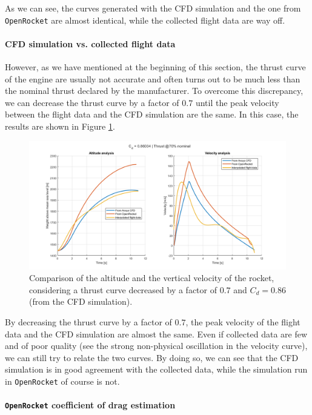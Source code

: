 As we can see, the curves generated with the CFD simulation and the one from \texttt{OpenRocket} are almost identical, while the collected flight data are way off.

\paragraph{CFD simulation vs. collected flight data}

However, as we have mentioned at the beginning of this section, the thrust curve of the engine are usually not accurate and often turns out to be much less than the nominal thrust declared by the manufacturer.
To overcome this discrepancy, we can decrease the thrust curve by a factor of $0.7$ until the peak velocity between the flight data and the CFD simulation are the same.
In this case, the results are shown in Figure \ref{fig:comparison_flight_data_70}.

\begin{figure}[H]
    \centering
    \includegraphics[width=\textwidth]{img/Validation/All_70.png}
    \caption{Comparison of the altitude and the vertical velocity of the rocket, considering a thrust curve decreased by a factor of $0.7$ and $C_d = 0.86$ (from the CFD simulation).}
    \label{fig:comparison_flight_data_70}
\end{figure}

By decreasing the thrust curve by a factor of $0.7$, the peak velocity of the flight data and the CFD simulation are almost the same.
Even if collected data are few and of poor quality (see the strong non-physical oscillation in the velocity curve), we can still try to relate the two curves.
By doing so, we can see that the CFD simulation is in good agreement with the collected data, while the simulation run in \texttt{OpenRocket} of course is not.

\paragraph{\texttt{OpenRocket} coefficient of drag estimation}

